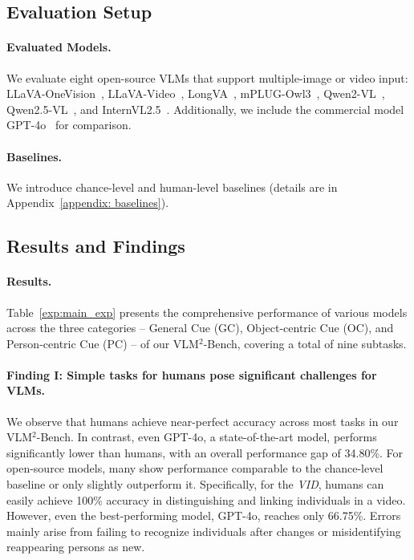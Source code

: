 \subsection{Evaluation Setup}
\paragraph{Evaluated Models.} We evaluate eight open-source VLMs that support multiple-image or video input: LLaVA-OneVision~\citep{llava-onevision}, LLaVA-Video~\citep{llava-video}, LongVA~\citep{longva}, mPLUG-Owl3~\citep{mplug-owl3}, Qwen2-VL~\citep{Qwen2-VL}, Qwen2.5-VL~\citep{Qwen2.5-VL}, and InternVL2.5~\citep{internvl}. Additionally, we include the commercial model GPT-4o~\citep{gpt4o} for comparison.

\paragraph{Baselines.} We introduce chance-level and human-level baselines (details are in Appendix~\ref{appendix: baselines}).





\subsection{Results and Findings}
\paragraph{Results.} Table~\ref{exp:main_exp} presents the comprehensive performance of various models across the  three categories -- General Cue (GC), Object-centric Cue (OC), and Person-centric Cue (PC) -- of our VLM$^2$-Bench, covering a total of nine subtasks.

\paragraph{Finding I: Simple tasks for humans pose significant challenges for VLMs.} We observe that humans achieve near-perfect accuracy across most tasks in our VLM$^2$-Bench. In contrast, even GPT-4o, a state-of-the-art model, performs significantly lower than humans, with an overall performance gap of 34.80\%. For open-source models, many show performance comparable to the chance-level baseline or only slightly outperform it. Specifically, for the \textit{VID}, humans can easily achieve 100\% accuracy in distinguishing and linking individuals in a video. However, even the best-performing model, GPT-4o, reaches only 66.75\%. Errors mainly arise from failing to recognize individuals after changes or misidentifying reappearing persons as new.


